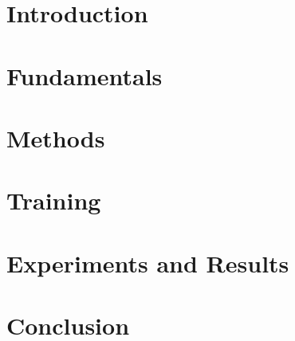 \documentclass[a4paper,11pt,headsepline, fleqn, english]{scrartcl}%
\begin{document}
	
	
	
	\newpage
	
	
	
	\newpage
	
	\setcounter{page}{1}
	
	\thispagestyle{empty}
	\tableofcontents
	
	\newpage
	
	
	\section{Introduction}

	
	
	\newpage
	\section{Fundamentals}
	
	
	
	\newpage
	\section{Methods}
	
	
	\newpage
	\section{Training}
	
	
	\newpage
	\section{Experiments and Results}

	
	
	\newpage
	\section{Conclusion}

 	
 	\newpage
	

	\newpage	
	
	\printbibliography
	\thispagestyle{plain}
\end{document}
